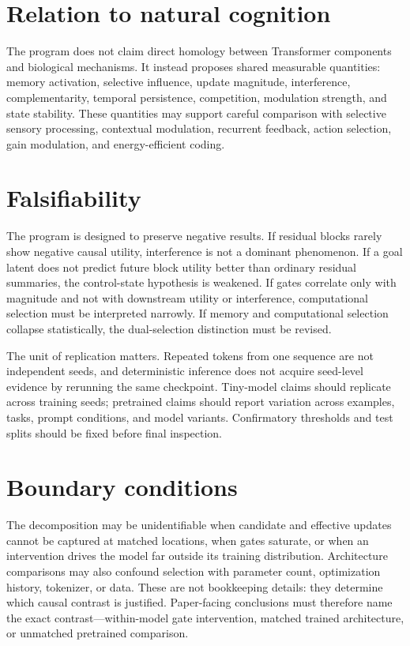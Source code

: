 \documentclass[10pt]{article}
\begin{document}
\section{Relation to natural cognition}
The program does not claim direct homology between Transformer components and biological mechanisms. It instead proposes shared measurable quantities: memory activation, selective influence, update magnitude, interference, complementarity, temporal persistence, competition, modulation strength, and state stability. These quantities may support careful comparison with selective sensory processing, contextual modulation, recurrent feedback, action selection, gain modulation, and energy-efficient coding.

\section{Falsifiability}
The program is designed to preserve negative results. If residual blocks rarely show negative causal utility, interference is not a dominant phenomenon. If a goal latent does not predict future block utility better than ordinary residual summaries, the control-state hypothesis is weakened. If gates correlate only with magnitude and not with downstream utility or interference, computational selection must be interpreted narrowly. If memory and computational selection collapse statistically, the dual-selection distinction must be revised.

The unit of replication matters. Repeated tokens from one sequence are not independent seeds, and deterministic inference does not acquire seed-level evidence by rerunning the same checkpoint. Tiny-model claims should replicate across training seeds; pretrained claims should report variation across examples, tasks, prompt conditions, and model variants. Confirmatory thresholds and test splits should be fixed before final inspection.

\section{Boundary conditions}
The decomposition may be unidentifiable when candidate and effective updates cannot be captured at matched locations, when gates saturate, or when an intervention drives the model far outside its training distribution. Architecture comparisons may also confound selection with parameter count, optimization history, tokenizer, or data. These are not bookkeeping details: they determine which causal contrast is justified. Paper-facing conclusions must therefore name the exact contrast---within-model gate intervention, matched trained architecture, or unmatched pretrained comparison.
\end{document}
